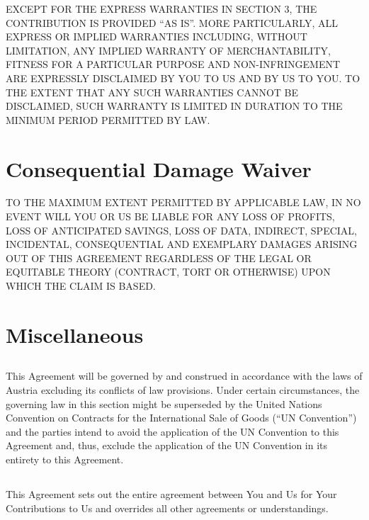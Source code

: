 \documentclass{article}
\begin{document}
EXCEPT FOR THE EXPRESS WARRANTIES IN SECTION 3, THE CONTRIBUTION IS
PROVIDED ``AS IS''. MORE PARTICULARLY, ALL EXPRESS OR IMPLIED WARRANTIES
INCLUDING, WITHOUT LIMITATION, ANY IMPLIED WARRANTY OF MERCHANTABILITY,
FITNESS FOR A PARTICULAR PURPOSE AND NON-INFRINGEMENT ARE EXPRESSLY
DISCLAIMED BY YOU TO US AND BY US TO YOU. TO THE EXTENT THAT ANY SUCH
WARRANTIES CANNOT BE DISCLAIMED, SUCH WARRANTY IS LIMITED IN DURATION
TO THE MINIMUM PERIOD PERMITTED BY LAW.

\section{Consequential Damage Waiver}

TO THE MAXIMUM EXTENT PERMITTED BY APPLICABLE LAW, IN NO EVENT WILL
YOU OR US BE LIABLE FOR ANY LOSS OF PROFITS, LOSS OF ANTICIPATED SAVINGS,
LOSS OF DATA, INDIRECT, SPECIAL, INCIDENTAL, CONSEQUENTIAL AND EXEMPLARY
DAMAGES ARISING OUT OF THIS AGREEMENT REGARDLESS OF THE LEGAL OR
EQUITABLE THEORY (CONTRACT, TORT OR OTHERWISE) UPON WHICH THE CLAIM IS
BASED.


\section{Miscellaneous}

\subsection{}

This Agreement will be governed by and construed in accordance with the laws of
Austria excluding its conflicts of law provisions. Under certain circumstances,
the governing law in this section might be superseded by the United Nations
Convention on Contracts for the International Sale of Goods (``UN Convention'')
and the parties intend to avoid the application of the UN Convention to this
Agreement and, thus, exclude the application of the UN Convention in its
entirety to this Agreement.

\subsection{}

This Agreement sets out the entire agreement between You and Us for Your
Contributions to Us and overrides all other agreements or understandings.

\subsection{}
\end{document}

